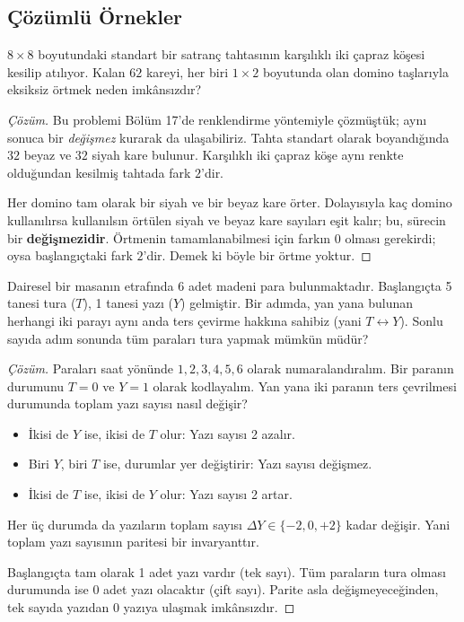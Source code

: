 \subsection{Çözümlü Örnekler}

\begin{example}
$8 \times 8$ boyutundaki standart bir satranç tahtasının karşılıklı iki çapraz köşesi kesilip atılıyor. Kalan $62$ kareyi, her biri $1 \times 2$ boyutunda olan domino taşlarıyla eksiksiz örtmek neden imkânsızdır?
\end{example}

\begin{proof}[Çözüm]
Bu problemi Bölüm 17'de renklendirme yöntemiyle çözmüştük; aynı sonuca bir \emph{değişmez} kurarak da ulaşabiliriz. Tahta standart olarak boyandığında $32$ beyaz ve $32$ siyah kare bulunur. Karşılıklı iki çapraz köşe aynı renkte olduğundan kesilmiş tahtada fark $2$'dir.

Her domino tam olarak bir siyah ve bir beyaz kare örter. Dolayısıyla kaç domino kullanılırsa kullanılsın örtülen siyah ve beyaz kare sayıları eşit kalır; bu, sürecin bir \textbf{değişmezidir}. Örtmenin tamamlanabilmesi için farkın $0$ olması gerekirdi; oysa başlangıçtaki fark $2$'dir. Demek ki böyle bir örtme yoktur.
\end{proof}

\begin{example}
Dairesel bir masanın etrafında 6 adet madeni para bulunmaktadır. Başlangıçta 5 tanesi tura ($T$), 1 tanesi yazı ($Y$) gelmiştir. Bir adımda, yan yana bulunan herhangi iki parayı aynı anda ters çevirme hakkına sahibiz (yani $T \leftrightarrow Y$). Sonlu sayıda adım sonunda tüm paraları tura yapmak mümkün müdür?
\end{example}

\begin{proof}[Çözüm]
Paraları saat yönünde $1, 2, 3, 4, 5, 6$ olarak numaralandıralım. Bir paranın durumunu $T = 0$ ve $Y = 1$ olarak kodlayalım. Yan yana iki paranın ters çevrilmesi durumunda toplam yazı sayısı nasıl değişir?
\begin{itemize}
    \item İkisi de $Y$ ise, ikisi de $T$ olur: Yazı sayısı 2 azalır.
    \item Biri $Y$, biri $T$ ise, durumlar yer değiştirir: Yazı sayısı değişmez.
    \item İkisi de $T$ ise, ikisi de $Y$ olur: Yazı sayısı 2 artar.
\end{itemize}
Her üç durumda da yazıların toplam sayısı $\Delta Y \in \{-2, 0, +2\}$ kadar değişir. Yani toplam yazı sayısının paritesi bir invaryanttır.

Başlangıçta tam olarak 1 adet yazı vardır (tek sayı). Tüm paraların tura olması durumunda ise 0 adet yazı olacaktır (çift sayı). Parite asla değişmeyeceğinden, tek sayıda yazıdan 0 yazıya ulaşmak imkânsızdır.
\end{proof}


